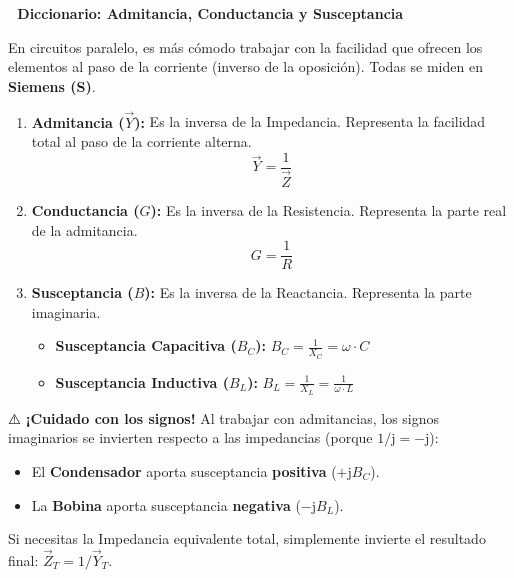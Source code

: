 \documentclass[
  a4paper,
  DIV=11,
  numbers=noendperiod]{scrreprt}
\providecommand{\tightlist}{%
  \setlength{\itemsep}{0pt}\setlength{\parskip}{0pt}}
\begin{document}
\begin{tcolorbox}[enhanced jigsaw, breakable, colback=white, left=2mm, leftrule=.75mm, rightrule=.15mm, toprule=.15mm, colframe=quarto-callout-warning-color-frame, arc=.35mm, bottomrule=.15mm, opacityback=0]

\vspace{-3mm}\textbf{📘 Diccionario: Admitancia, Conductancia y Susceptancia}\vspace{3mm}

En circuitos paralelo, es más cómodo trabajar con la facilidad que
ofrecen los elementos al paso de la corriente (inverso de la oposición).
Todas se miden en \textbf{Siemens (S)}.

\begin{enumerate}
\def\labelenumi{\arabic{enumi}.}
\item
  \textbf{Admitancia (\(\vec{Y}\)):} Es la inversa de la Impedancia.
  Representa la facilidad total al paso de la corriente alterna.
  \[\vec{Y} = \frac{1}{\vec{Z}}\]
\item
  \textbf{Conductancia (\(G\)):} Es la inversa de la Resistencia.
  Representa la parte real de la admitancia. \[G = \frac{1}{R}\]
\item
  \textbf{Susceptancia (\(B\)):} Es la inversa de la Reactancia.
  Representa la parte imaginaria.

  \vspace{-1em}

  \begin{itemize}
  \tightlist
  \item
    \textbf{Susceptancia Capacitiva (\(B_C\)):}
    \(B_C = \frac{1}{X_C} = \omega \cdot C\)
  \item
    \textbf{Susceptancia Inductiva (\(B_L\)):}
    \(B_L = \frac{1}{X_L} = \frac{1}{\omega \cdot L}\)
  \end{itemize}
\end{enumerate}

⚠️ \textbf{¡Cuidado con los signos!} Al trabajar con admitancias, los
signos imaginarios se invierten respecto a las impedancias (porque
\(1/\mathrm{j} = -\mathrm{j}\)):

\vspace{-1em}

\begin{itemize}
\tightlist
\item
  El \textbf{Condensador} aporta susceptancia \textbf{positiva}
  (\(+\mathrm{j}B_C\)).
\item
  La \textbf{Bobina} aporta susceptancia \textbf{negativa}
  (\(-\mathrm{j}B_L\)).
\end{itemize}

Si necesitas la Impedancia equivalente total, simplemente invierte el
resultado final: \(\vec{Z}_{T} = 1 / \vec{Y}_{T}\).

\end{tcolorbox}
\end{document}
